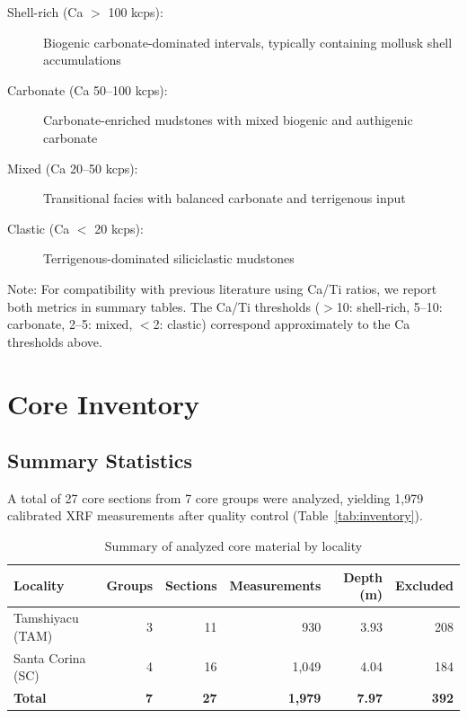 \documentclass[11pt,a4paper]{article}
\begin{document}
\begin{description}
    \item[Shell-rich (Ca $>$ 100 kcps):] Biogenic carbonate-dominated intervals, typically containing mollusk shell accumulations
    \item[Carbonate (Ca 50--100 kcps):] Carbonate-enriched mudstones with mixed biogenic and authigenic carbonate
    \item[Mixed (Ca 20--50 kcps):] Transitional facies with balanced carbonate and terrigenous input
    \item[Clastic (Ca $<$ 20 kcps):] Terrigenous-dominated siliciclastic mudstones
\end{description}

Note: For compatibility with previous literature using Ca/Ti ratios, we report both metrics in summary tables. The Ca/Ti thresholds ($>$10: shell-rich, 5--10: carbonate, 2--5: mixed, $<$2: clastic) correspond approximately to the Ca thresholds above.



\section{Core Inventory}

\subsection{Summary Statistics}

A total of 27 core sections from 7 core groups were analyzed, yielding 1,979 calibrated XRF measurements after quality control (Table~\ref{tab:inventory}).

\begin{table}[h]
\centering
\caption{Summary of analyzed core material by locality}
\label{tab:inventory_summary}
\begin{tabular}{lrrrrr}
\toprule
Locality & Groups & Sections & Measurements & Depth (m) & Excluded \\
\midrule
Tamshiyacu (TAM) & 3 & 11 & 930 & 3.93 & 208 \\
Santa Corina (SC) & 4 & 16 & 1,049 & 4.04 & 184 \\
\midrule
\textbf{Total} & \textbf{7} & \textbf{27} & \textbf{1,979} & \textbf{7.97} & \textbf{392} \\
\bottomrule
\end{tabular}
\end{table}
\end{document}
